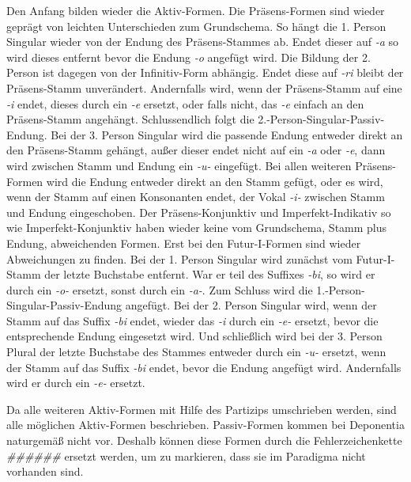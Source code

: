 Den Anfang bilden wieder die Aktiv-Formen. Die Präsens-Formen sind wieder geprägt von leichten Unterschieden zum Grundschema. So hängt die 1. Person Singular wieder von der Endung des Präsens-Stammes ab. Endet dieser auf \textit{-a} so wird dieses entfernt bevor die Endung \textit{-o} angefügt wird. Die Bildung der 2. Person ist dagegen von der Infinitiv-Form abhängig. Endet diese auf \textit{-ri} bleibt der Präsens-Stamm unverändert. Andernfalls wird, wenn der Präsens-Stamm auf eine \textit{-i} endet, dieses durch ein \textit{-e} ersetzt, oder falls nicht, das \textit{-e} einfach an den Präsens-Stamm angehängt. Schlussendlich folgt die 2.-Person-Singular-Passiv-Endung. Bei der 3. Person Singular wird die passende Endung entweder direkt an den Präsens-Stamm gehängt, außer dieser endet nicht auf ein \textit{-a} oder \textit{-e}, dann wird zwischen Stamm und Endung ein \textit{-u-} eingefügt. Bei allen weiteren Präsens-Formen wird die Endung entweder direkt an den Stamm gefügt, oder es wird, wenn der Stamm auf einen Konsonanten endet, der Vokal \textit{-i-} zwischen Stamm und Endung eingeschoben. Der Präsens-Konjunktiv und Imperfekt-Indikativ so wie Imperfekt-Konjunktiv haben wieder keine vom Grundschema, Stamm plus Endung, abweichenden Formen. Erst bei den Futur-I-Formen sind wieder Abweichungen zu finden. Bei der 1. Person Singular wird zunächst vom Futur-I-Stamm der letzte Buchstabe entfernt. War er teil des Suffixes \textit{-bi}, so wird er durch ein \textit{-o-} ersetzt, sonst durch ein \textit{-a-}. Zum Schluss wird die 1.-Person-Singular-Passiv-Endung angefügt. Bei der 2. Person Singular wird, wenn der Stamm auf das Suffix \textit{-bi} endet, wieder das \textit{-i} durch ein \textit{-e-} ersetzt, bevor die entsprechende Endung eingesetzt wird. Und schließlich wird bei der 3. Person Plural der letzte Buchstabe des Stammes entweder durch ein \textit{-u-} ersetzt, wenn der Stamm auf das Suffix \textit{-bi} endet, bevor die Endung angefügt wird. Andernfalls wird er durch ein \textit{-e-} ersetzt. \par
Da alle weiteren Aktiv-Formen mit Hilfe des Partizips umschrieben werden, sind alle möglichen Aktiv-Formen beschrieben. Passiv-Formen kommen bei Deponentia naturgemäß nicht vor. Deshalb können diese Formen durch die Fehlerzeichenkette \textit{\#\#\#\#\#\#} ersetzt werden, um zu markieren, dass sie im Paradigma nicht vorhanden sind. \par
